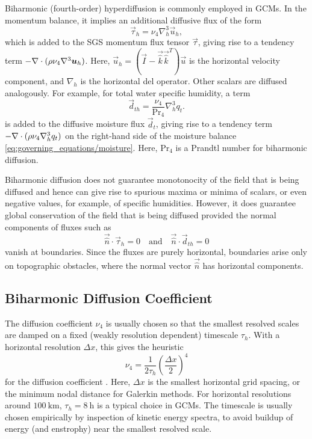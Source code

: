 \documentclass{report}
\begin{document}
Biharmonic (fourth-order) hyperdiffusion is commonly employed in GCMs. In the momentum balance, it implies an additional diffusive flux of the form
\begin{equation}
\vec{\tau}_h = \nu_4 \nabla_h^3 \vec{u}_h,
\end{equation}
which is added to the SGS momentum flux tensor $\vec{\tau}$, giving rise to a tendency term $-\nabla \cdot (\rho \nu_4 \nabla^3 \boldsymbol{{u}}_h)$. Here, $\vec{u}_h = (\vec{I} - \vec{\hat k} \vec{\hat k}^T) \vec{u}$ is the horizontal velocity component, and $\nabla_h$ is the horizontal del operator. Other scalars are diffused analogously. For example, for total water specific humidity, a term 
\begin{equation}
    \vec{d}_{th} = \frac{\nu_4}{\mathrm{Pr}_4} \nabla_h^3 q_t.
\end{equation}
is added to the diffusive moisture flux $\vec{d}_t$, giving rise to a tendency term $-\nabla \cdot (\rho \nu_4 \nabla_h^3 q_t)$ on the right-hand side of the moisture balance \eqref{eq:governing_equations/moisture}. Here, $\mathrm{Pr}_4$ is a Prandtl number for biharmonic diffusion.

Biharmonic diffusion does not guarantee monotonocity of the field that is being diffused and hence can give rise to spurious maxima or minima of scalars, or even negative values, for example, of specific humidities. However, it does guarantee global conservation of the field that is being diffused provided the normal components of fluxes such as 
\[
\vec{\hat n} \cdot \vec{\tau}_h =0 \quad \text{and} \quad \vec{\hat n} \cdot \vec{d}_{th} = 0
\]
vanish at boundaries. Since the fluxes are purely horizontal, boundaries arise only on topographic obstacles, where the normal vector $\vec{\hat n}$ has horizontal components.

\subsection{Biharmonic Diffusion Coefficient}

The diffusion coefficient $\nu_4$ is usually chosen so that the smallest resolved scales are damped on a fixed (weakly resolution dependent) timescale $\tau_h$. With a horizontal resolution $\Delta x$, this gives the heuristic 
\begin{equation}
    \nu_4 = \frac{1}{2\tau_h} \left(\frac{\Delta x}{2}\right)^4
\end{equation}
for the diffusion coefficient \citep{Jablonowski11a}. Here, $\Delta x$ is the smallest horizontal grid spacing, or the minimum nodal distance for Galerkin methods. For horizontal resolutions around $100~\mathrm{km}$, $\tau_h = 8~\mathrm{h}$ is a typical choice in GCMs. The timescale is usually chosen empirically by inspection of kinetic energy spectra, to avoid buildup of energy (and enstrophy) near the smallest resolved scale.
\end{document}
